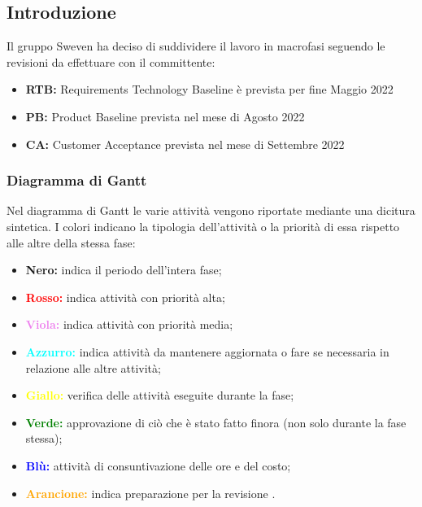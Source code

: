 \subsection{Introduzione}
Il gruppo Sweven ha deciso di suddividere il lavoro in macrofasi seguendo le revisioni da effettuare con il committente:
\begin{itemize}
    \item \textbf{RTB:} Requirements Technology Baseline è prevista per fine Maggio 2022
    \item \textbf{PB:} Product Baseline prevista nel mese di Agosto 2022
    \item \textbf{CA:} Customer Acceptance prevista nel mese di Settembre 2022
\end{itemize}

\subsubsection{Diagramma di Gantt}
Nel diagramma di Gantt le varie attività vengono riportate mediante una dicitura sintetica. 
I colori indicano la tipologia dell'attività o la priorità di essa rispetto alle altre della stessa fase:
\begin{itemize}
    \item \textbf{Nero:} indica il periodo dell'intera fase;
    \item \textbf{\textcolor{red}{Rosso:}} indica attività con priorità alta;
    \item \textbf{\textcolor{violet}{Viola:}} indica attività con priorità media;
    \item \textbf{\textcolor{cyan}{Azzurro:}} indica attività da mantenere aggiornata o fare se necessaria in relazione alle altre attività;
    \item \textbf{\textcolor{yellow}{Giallo:}} verifica delle attività eseguite durante la fase;
    \item \textbf{\textcolor{green}{Verde:}} approvazione di ciò che è stato fatto finora (non solo durante la fase stessa);
    \item \textbf{\textcolor{blue}{Blù:}} attività di consuntivazione delle ore e del costo;
    \item \textbf{\textcolor{orange}{Arancione:}} indica preparazione per la revisione .
\end{itemize}

